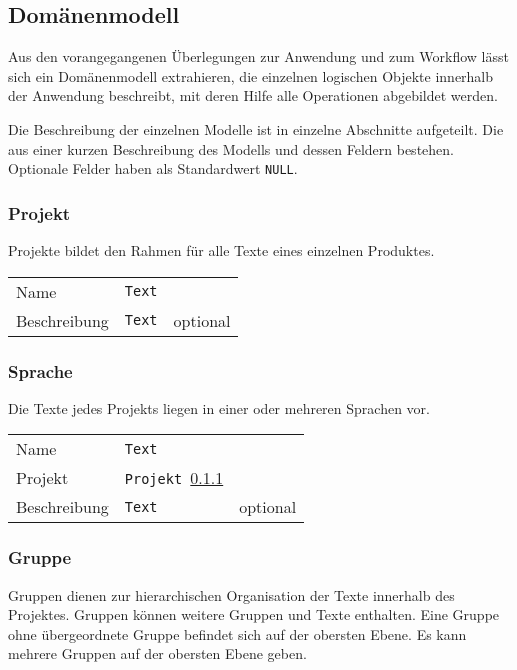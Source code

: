 \subsection{Domänenmodell}\label{l:domänenmodell}

Aus den vorangegangenen Überlegungen zur Anwendung und zum Workflow lässt sich ein Domänenmodell extrahieren, die einzelnen logischen Objekte innerhalb der Anwendung beschreibt, mit deren Hilfe alle Operationen abgebildet werden.

Die Beschreibung der einzelnen Modelle ist in einzelne Abschnitte aufgeteilt. Die aus einer kurzen Beschreibung des Modells und dessen Feldern bestehen. Optionale Felder haben als Standardwert \texttt{NULL}.

\subsubsection{Projekt}\label{model:projekt}

Projekte bildet den Rahmen für alle Texte eines einzelnen Produktes.

\begin{tabular}{@{}l l l}
\hline
Name&\texttt{Text}&\\
Beschreibung&\texttt{Text}&optional\\
\hline
\end{tabular}

\subsubsection{Sprache}\label{model:sprache}

Die Texte jedes Projekts liegen in einer oder mehreren Sprachen vor.

\begin{tabular}{@{}l l l}
\hline
Name&\texttt{Text}&\\
Projekt&\texttt{Projekt \ref{model:projekt}}&\\
Beschreibung&\texttt{Text}&optional\\
\hline
\end{tabular}

\subsubsection{Gruppe}\label{model:gruppe}

Gruppen dienen zur hierarchischen Organisation der Texte innerhalb des Projektes. Gruppen können weitere Gruppen und Texte enthalten. Eine Gruppe ohne übergeordnete Gruppe befindet sich auf der obersten Ebene. Es kann mehrere Gruppen auf der obersten Ebene geben.

